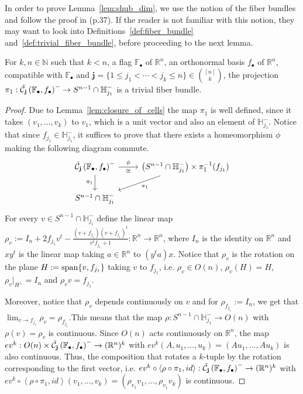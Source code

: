 In order to prove Lemma~\ref{lem:shub_dim}, we use the notion of the fiber bundles and follow the proof in \cite{vec_bundles} (p.37). If the reader is not familiar with this notion, they may want to look into Definitions~\ref{def:fiber_bundle} and~\ref{def:trivial_fiber_bundle}, before proceeding to the next lemma.
\begin{lemma}\label{lem:trivial_fb} For $k,n\in\mathbb{N}$ such that $k<n$, a flag $\mathbb{F}_{\bullet}$ of $\mathbb{R}^n$, an orthonormal basis $f_{\bullet}$ of $\mathbb{R}^n$, compatible with $\mathbb{F}_{\bullet}$ and $\mathbf{j}=\{1\leq j_1<\cdots<j_k\leq n\}\in\binom{[n]}{k}$, the projection $\pi_1:\tilde{\mathcal{C}}_{\mathbf{j}}\left(\mathbb{F}_{\bullet},f_{\bullet}\right)^-\to S^{n-1}\cap\mathbb{H}_{j_1}^-$ is a trivial fiber bundle.
\end{lemma}
\begin{proof} Due to Lemma~\ref{lem:closure_of_cells} the map $\pi_1$ is well defined, since it takes $(v_1,\ldots,v_k)$ to $v_1$, which is a unit vector and also an element of $\mathbb{H}_{j_1}^-$. Notice that since $f_{j_1}\in\mathbb{H}_{j_1}^-$, it suffices to prove that there exists a homeomorphism $\phi$ making the following diagram commute.
\begin{equation}\label{eq:phi_for_trivial}
\begin{tikzcd}
\stcell{j}^-\ar[r,"\phi","\cong"']\ar[d,"\pi_1"']&\big(S^{n-1}\cap\mathbb{H}_{j_1}^-\big)\times\pi_1^{-1}(f_{j_1})\ar[dl,"\pi_1"]\\
S^{n-1}\cap\mathbb{H}_{j_1}^-
\end{tikzcd}
\end{equation}
For every $v\in S^{n-1}\cap\mathbb{H}_{j_1}^-$ define the linear map $\rho_v:=I_n+2f_{j_1}v^t-\frac{(v+f_{j_1})(v+f_{j_1})^t}{v^tf_{j_1}+1}:\mathbb{R}^n\to\mathbb{R}^n$, where $I_n$ is the identity on $\mathbb{R}^n$ and $xy^t$ is the linear map taking $a\in\mathbb{R}^n$ to $(y^ta)x$. Notice that $\rho_v$ is the rotation on the plane $H:=\mathrm{span}\{v,f_{j_1}\}$ taking $v$ to $f_{j_1}$, i.e. $\rho_v\in O(n)$, $\rho_v(H)=H$, $\rho_v|_{H^{\perp}}=I_n$ and $\rho_vv=f_{j_1}$.

Moreover, notice that $\rho_v$ depends continuously on $v$ and for $\rho_{f_{j_1}}:=I_n$, we get that $\lim_{v\to f_{j_1}}\rho_v=\rho_{f_{j_1}}$.This means that the map $\rho:S^{n-1}\cap\mathbb{H}_{j_1}^-\to O(n)$ with $\rho(v)=\rho_v$ is continuous. Since $O(n)$ acts continuously on $\mathbb{R}^n$, the map $ev^k:O(n)\times\tilde{\mathcal{C}}_{\mathbf{j}}\left(\mathbb{F}_{\bullet},f_{\bullet}\right)^-\to(\mathbb{R}^n)^k$ with $ev^k(A,u_1,\ldots,u_k)=(Au_1,\ldots,Au_k)$ is also continuous. Thus, the composition that rotates a $k$-tuple by the rotation corresponding to the first vector, i.e. $ev^k\circ\left<\rho\circ\pi_1,id\right>:\tilde{\mathcal{C}}_{\mathbf{j}}\left(\mathbb{F}_{\bullet},f_{\bullet}\right)^-\to(\mathbb{R}^n)^k$ with $ev^k\circ\left<\rho\circ\pi_1,id\right>(v_1,\ldots,v_k)=(\rho_{v_1}v_1,\ldots,\rho_{v_1}v_k)$ is continuous.


\end{proof}
